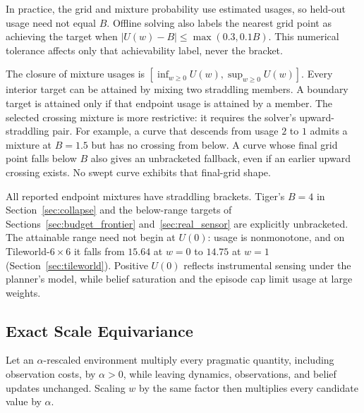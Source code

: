 \documentclass[runningheads]{llncs}
\begin{document}
In practice, the grid and mixture probability use estimated usages, so held-out usage need not equal $B$. Offline solving also labels the nearest grid point as achieving the target when $|U(w)-B|\le\max(0.3,0.1B)$. This numerical tolerance affects only that achievability label, never the bracket.

The closure of mixture usages is $[\inf_{w\ge0}U(w),\sup_{w\ge0}U(w)]$. Every interior target can be attained by mixing two straddling members. A boundary target is attained only if that endpoint usage is attained by a member. The selected crossing mixture is more restrictive: it requires the solver's upward-straddling pair. For example, a curve that descends from usage $2$ to $1$ admits a mixture at $B=1.5$ but has no crossing from below. A curve whose final grid point falls below $B$ also gives an unbracketed fallback, even if an earlier upward crossing exists. No swept curve exhibits that final-grid shape.

All reported endpoint mixtures have straddling brackets. Tiger's $B=4$ in Section~\ref{sec:collapse} and the below-range targets of Sections~\ref{sec:budget_frontier} and~\ref{sec:real_sensor} are explicitly unbracketed. The attainable range need not begin at $U(0)$: usage is nonmonotone, and on Tileworld-$6{\times}6$ it falls from $15.64$ at $w=0$ to $14.75$ at $w=1$ (Section~\ref{sec:tileworld}). Positive $U(0)$ reflects instrumental sensing under the planner's model, while belief saturation and the episode cap limit usage at large weights.

\subsection{Exact Scale Equivariance}
\label{sec:pi1}

Let an $\alpha$-rescaled environment multiply every pragmatic quantity, including observation costs, by $\alpha>0$, while leaving dynamics, observations, and belief updates unchanged. Scaling $w$ by the same factor then multiplies every candidate value by $\alpha$.
\end{document}
